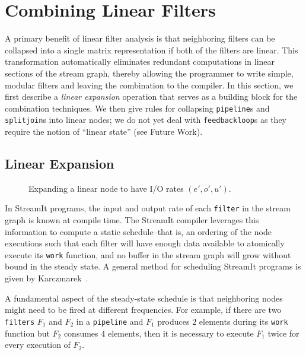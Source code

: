 \section{Combining Linear Filters}
\label{sec:combine}

A primary benefit of linear filter analysis is that neighboring
filters can be collapsed into a single matrix representation if both
of the filters are linear.  This transformation automatically
eliminates redundant computations in linear sections of the stream
graph, thereby allowing the programmer to write simple, modular
filters and leaving the combination to the compiler.  In this section,
we first describe a {\it linear expansion} operation that serves as a
building block for the combination techniques.  We then give rules for
collapsing {\tt pipeline}s and {\tt splitjoin}s into linear nodes; we
do not yet deal with {\tt feedbackloop}s as they require the notion of
``linear state'' (see Future Work).

\subsection{Linear Expansion}

\begin{figure}[t]
\center
\epsfxsize=3.0in
\vspace{-6pt}
\caption{Expanding a linear node to have I/O rates $(e', o', u')$.  }
\label{fig:expanding-a-matrix}
\vspace{-12pt}
\end{figure}

In StreamIt programs, the input and output rate of each {\tt filter} in the
stream graph is known at compile time.  The StreamIt compiler
leverages this information to compute a static schedule--that is, an
ordering of the node executions such that each filter will have enough
data available to atomically execute its {\tt work} function, and no
buffer in the stream graph will grow without bound in the steady
state.  A general method for scheduling StreamIt programs is given by
Karczmarek~\cite{karczma-thesis}.

A fundamental aspect of the steady-state schedule is that neighboring
nodes might need to be fired at different frequencies.  For example,
if there are two {\tt filters} $F_1$ and $F_2$ in a {\tt pipeline} and
$F_1$ produces $2$ elements during its {\tt work} function but $F_2$
consumes $4$ elements, then it is necessary to execute $F_1$ twice for
every execution of $F_2$.

